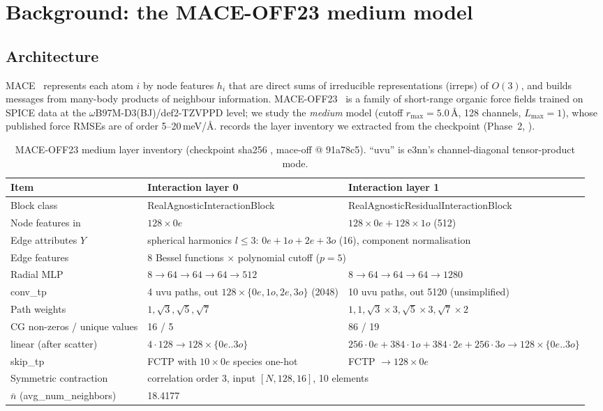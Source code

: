 \section{Background: the MACE-OFF23 medium model}
\label{sec:background}

\subsection{Architecture}
MACE~\cite{batatia2022mace} represents each atom $i$ by node features $h_i$ that are direct sums of irreducible representations (irreps) of $O(3)$, and builds messages from many-body products of neighbour information. MACE-OFF23~\cite{kovacs2023maceoff} is a family of short-range organic force fields trained on SPICE data at the $\omega$B97M-D3(BJ)/def2-TZVPPD level; we study the \emph{medium} model (cutoff $r_{\max}=5.0$\,\AA, 128 channels, $L_{\max}=1$), whose published force RMSEs are of order 5--20\,meV/\AA.  records the layer inventory we extracted from the checkpoint (Phase~2, ).

\begin{table}[h]
\centering
\caption{MACE-OFF23 medium layer inventory (checkpoint sha256 , mace-off @ 91a78c5). ``uvu'' is e3nn's channel-diagonal tensor-product mode.}
\label{tab:arch}
\small
\begin{tabular}{p{3.6cm}p{5.2cm}p{5.2cm}}
\toprule
Item & Interaction layer 0 & Interaction layer 1 \\
\midrule
Block class & RealAgnosticInteractionBlock & RealAgnosticResidualInteractionBlock \\
Node features in & $128\times0e$ & $128\times0e+128\times1o$ (512) \\
Edge attributes $Y$ & \multicolumn{2}{l}{spherical harmonics $l\le3$: $0e+1o+2e+3o$ (16), component normalisation} \\
Edge features & \multicolumn{2}{l}{8 Bessel functions $\times$ polynomial cutoff ($p=5$)} \\
Radial MLP & $8\to64\to64\to64\to512$ & $8\to64\to64\to64\to1280$ \\
conv\_tp & 4 uvu paths, out $128\times\{0e,1o,2e,3o\}$ (2048) & 10 uvu paths, out 5120 (unsimplified) \\
Path weights & $1,\sqrt3,\sqrt5,\sqrt7$ & $1,1,\sqrt3\times3,\sqrt5\times3,\sqrt7\times2$ \\
CG non-zeros / unique values & 16 / 5 & 86 / 19 \\
linear (after scatter) & $4\cdot128\to128\times\{0e..3o\}$ & $256{\cdot}0e{+}384{\cdot}1o{+}384{\cdot}2e{+}256{\cdot}3o\to128\times\{0e..3o\}$ \\
skip\_tp & FCTP with $10\times0e$ species one-hot & FCTP $\to128\times0e$ \\
Symmetric contraction & \multicolumn{2}{l}{correlation order 3, input $[N,128,16]$, 10 elements} \\
$\bar n$ (avg\_num\_neighbors) & \multicolumn{2}{l}{18.4177} \\
\bottomrule
\end{tabular}
\end{table}

